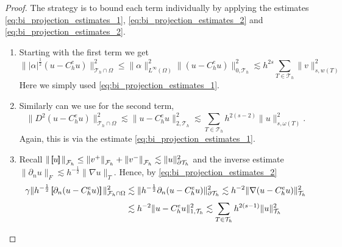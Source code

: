 \begin{proof}
    The strategy is to bound each term individually by applying the estimates \eqref{eq:bi_projection_estimates_1}, \eqref{eq:bi_projection_estimates_2} and \eqref{eq:bi_projection_estimates_2}.
    \begin{enumerate}[label=\arabic*)]
        \item     Starting with the first term we get
    \[
            \| |\alpha |^{\frac{1}{2}} ( u - C_{h}^{e}u) \|_{ \mathcal{T} _{h} \cap \Omega  }^{ 2}  \le  \| \alpha  \|_{L^\infty ( \Omega )    }^{2  }   \|  ( u - C_{h}^{e}u) \|_{0,\mathcal{T} _{h}  }^{ 2} \lesssim  h^{2s} \sum_{T \in \mathcal{T}
            _{h}}^{}   \| v \|_{s,w( T)  }^{  2}
    \]
    Here we simply used \eqref{eq:bi_projection_estimates_1}.
\item
    Similarly can we use  for the second term, \[
    \| D^2 ( u - C_{h}^{e}u ) \|_{\mathcal{T} _{h} \cap \Omega   }^{ 2 } \lesssim  \|  u - C_{h}^{e}u  \|_{2,\mathcal{T} _{h}   }^{ 2 } \lesssim \sum_{T \in \mathcal{T} _{h}}^{} h^{2(s-2)} \| u \|_{ s, \omega ( T)  }^{ 2 }.
    \]
    Again, this is via the estimate \eqref{eq:bi_projection_estimates_1}.
\item
        Recall $\| \left[\!\!\left[  u  \right]\!\!\right]   \|_{ \mathcal{F} _{h} }^{  } \le \| v^{+}   \|_{ \mathcal{F} _{h} }^{  } +   \| v^{-}   \|_{ \mathcal{F} _{h} }^{  } \lesssim  \| u \|_{ \partial\mathcal{T }_{h}  }^{2  }  $ and the inverse estimate $\| \partial _{n} u \|_{ F  }^{} \lesssim h^{-\frac{1}{2}} \| \nabla u \|_{ T }^{  }  $.
     Hence, by \eqref{eq:bi_projection_estimates_2}  \[
        \begin{split}
            \gamma \| h^{-\frac{1}{2}} \left[\!\!\left[  \partial _{n} ( u - C_{h}^{e}u )  \right]\!\!\right]   \|_{ \mathcal{F}_{h} \cap \Omega   }^{  2}   &\lesssim \| h^{-\frac{1}{2}}  \partial _{n} ( u - C_{h}^{e}u )    \|_{  \partial \mathcal{T} _{h} }^{2  }
       \lesssim h^{-2} \|   \nabla  ( u - C_{h}^{e}u )    \|_{  \mathcal{T} _{h} }^{2  }     \\
                                                                                                                 &\lesssim h^{-2} \|      u - C_{h}^{e}u     \|_{1,  \mathcal{T}_{h} }^{2  }
                                                                                                                 \lesssim \sum_{T \in \mathcal{T} _{h}}^{} h^{2(s-1)} \| u \|_{ \mathcal{T} _{h}  }^{ 2}
        \end{split}
    \]
\end{enumerate}
\end{proof}
